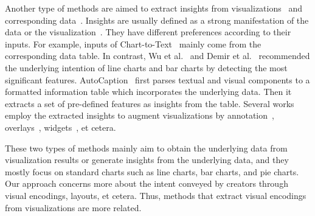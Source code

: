 Another type of methods are aimed to extract insights from visualizations~\cite{DBLP:conf/diagrams/WuCEC10, DBLP:journals/nrhm/DemirOSECMC10} and corresponding data~\cite{DBLP:conf/inlg/ObeidH20, DBLP:journals/ivs/CuiBYE19}.
Insights are usually defined as a strong manifestation of the data or the visualization~\cite{DBLP:journals/pvldb/DemiralpHPP17}.
They have different preferences according to their inputs.
For example, inputs of Chart-to-Text~\cite{DBLP:conf/inlg/ObeidH20} mainly come from the corresponding data table. %
In contrast, Wu et al.~\cite{DBLP:conf/diagrams/WuCEC10} and Demir et al.~\cite{DBLP:journals/nrhm/DemirOSECMC10} recommended the underlying intention of line charts and bar charts by detecting the most significant features.
AutoCaption~\cite{DBLP:conf/apvis/LiuXHWY20} first parses textual and visual components to a formatted information table which incorporates the underlying data.
Then it extracts a set of pre-defined features as insights from the table.
Several works employ the extracted insights to augment visualizations by annotation~\cite{DBLP:conf/ieeevast/Kandogan12, DBLP:journals/tvcg/BryanMW17}, overlays~\cite{DBLP:journals/tvcg/KongA12}, widgets~\cite{DBLP:journals/tvcg/SrinivasanDES19}, et cetera.

These two types of methods mainly aim to obtain the underlying data from visualization results or generate insights from the underlying data, 
and they mostly focus on standard charts such as line charts, bar charts, and pie charts.
Our approach concerns more about the intent conveyed by creators through visual encodings, layouts, et cetera.
Thus, methods that extract visual encodings from visualizations are more related.%

